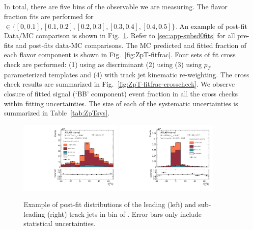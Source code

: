 \clearpage

\subsection{\zpt}

In total, there are five bins of the \zpt observable we are measuring. The flavor fraction fits are performed for \zpt $\in\{[0, 0.1], [0.1, 0.2], [0.2, 0.3], [0.3,0.4], [0.4,0.5]\}$. An example of post-fit Data/MC comparison is shown in Fig.~\ref{fig:ZpT-fit-example}. Refer to \ref{sec:app-subsd0fits} for all pre-fits and post-fits data-MC comparisons. The MC predicted and fitted fraction of each flavor component is shown in Fig.~\ref{fig:ZpT-fitfrac}. Four sets of fit cross check are performed: (1) using \sdzero as discriminant (2) using \subsubsdzero (3) using $p_T$ parameterized templates and (4) with track jet kinematic re-weighting. The cross check results are summarized in Fig.~\ref{fig:ZpT-fitfrac-crosscheck}. We observe closure of fitted signal (`BB' component) event fraction in all the cross checks within fitting uncertainties. The size of each of the systematic uncertainties is summarized in Table~\ref{tab:ZpTsys}.


\begin{figure}[htbp]
  \centering
 \includegraphics[width=0.45\textwidth]{figures/gbb/paperplots/Canv_Fit_zpt_LpT_INF_SpT_INF_coarse_x}  
 \includegraphics[width=0.45\textwidth]{figures/gbb/paperplots/Canv_Fit_b0_25_zpt_0_3_LpT_INF_SpT_INF_coarse_y}
 \caption{Example of post-fit \subsdzero distributions of the leading (left) and sub-leading (right) track jets in bin of \zpt. Error bars only include statistical uncertainties.}
 \label{fig:ZpT-fit-example}
\end{figure}


